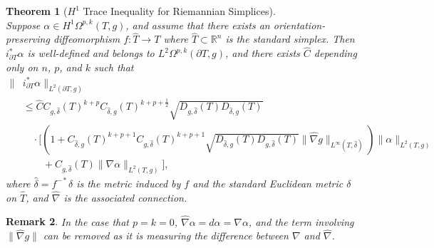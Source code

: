 \documentclass[11pt]{article}
\newtheorem{theorem}{Theorem}
\newtheorem{remark}[theorem]{Remark}
\begin{document}
\begin{theorem}[$H^1$ Trace Inequality for Riemannian Simplices]
\label{H1tracethrm}\;\\
Suppose $\alpha \in H^1\Omega^{p,k}(T,g)$, and assume that there exists an orientation-preserving diffeomorphism $f: \hat T \to T$ where $\hat T \subset \mathbb{R}^n$ is the standard simplex. Then $i_{\partial T}^*\alpha$ is well-defined and belongs to $L^2\Omega^{p,k}(\partial T,g)$, and there exists $\hat{C}$ depending only on $n$, $p$, and $k$ such that
\begin{align*}
\|&i_{\partial T}^*\alpha\|_{L^2(\partial T,g)} \\&\le \hat C  C_{g,\hat \delta}(T)^{k + p} C_{\hat \delta,g}(T)^{k+p + \frac{1}{2}}\sqrt{D_{g,\hat \delta}(T)D_{\hat \delta,g}(T)} \\
&\quad\cdot \bigg[\left(1 + C_{\hat \delta, g}(T)^{k+p + 1}C_{g,\hat \delta}(T)^{k+p + 1}\sqrt{D_{\hat \delta,g}(T)D_{g,\hat \delta}(T)} \|\hat \nabla g\|_{L^\infty(T,\hat \delta)}\right)\|\alpha\|_{L^2(T,g)} \\
&\quad\quad + C_{g,\hat \delta}(T)\|\nabla \alpha\|_{L^2(T,g)}\bigg],
\end{align*}
where $\hat \delta = f^{-*} \delta$ is the metric induced by $f$ and the standard Euclidean metric $\delta$ on $\hat T$, and $\hat\nabla$ is the associated connection.
\end{theorem}

\begin{remark}
In the case that $p = k = 0$, $\hat\nabla\alpha = d\alpha = \nabla\alpha$, and the term involving $\|\hat \nabla g\|$ can be removed as it is measuring the difference between $\nabla$ and $\hat \nabla$.
\end{remark}
\end{document}
